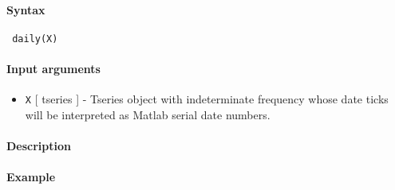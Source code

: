 


	\paragraph{Syntax}
 
 \begin{verbatim}
 daily(X)
 \end{verbatim}
 
 \paragraph{Input arguments}
 
 \begin{itemize}
 \item
   \texttt{X} {[} tseries {]} - Tseries object with indeterminate
   frequency whose date ticks will be interpreted as Matlab serial date
   numbers.
 \end{itemize}
 
 \paragraph{Description}
 
 \paragraph{Example}


